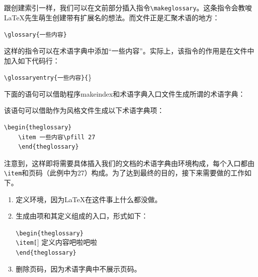 跟创建索引一样，我们可以在文前部分插入指令\verb|\makeglossary|。这条指令会教唆\LaTeX 先生萌生创建带有扩展名的想法。而文件正是汇聚术语的地方：

\begin{dmd}
\verb|\glossary{一些内容}|
\end{dmd}

这样的指令可以在术语字典中添加“一些内容”。实际上，该指令的作用是在文件中加入如下代码行：

\begin{dmd}
\verb+\glossaryentry{一些内容}{+\}
\end{dmd}

下面的语句可以借助程序\textsf{makeindex}和术语字典入口文件生成所谓的术语字典：


该语句可以借助作为风格文件生成以下术语字典项：

\begin{dmd}
\begin{verbatim}
\begin{theglossary}
    \item 一些内容\pfill 27
    \end{theglossary}
\end{verbatim}
\end{dmd}

注意到，这样即将需要具体插入我们的文档的术语字典由环境构成，每个入口都由\verb|\item|和页码（此例中为27）构成。为了达到最终的目的，接下来需要做的工作如下。

\begin{enumerate}
    \item 定义环境，因为\LaTeX 在这件事上什么都没做。
    \item 生成由项和其定义组成的入口，形式如下：
    
    \begin{dmd}
    \verb|\begin{theglossary}|\\
    \verb|\item[|] 定义内容吧啦吧啦\\
    \verb+\end{theglossary}+
    \end{dmd}
    \item 删除页码，因为术语字典中不展示页码。
\end{enumerate}

